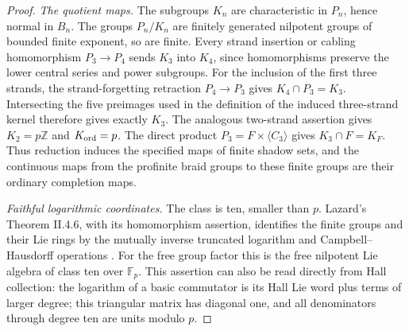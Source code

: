 \begin{proof}
\emph{The quotient maps.}
The subgroups $K_n$ are characteristic in $P_n$, hence normal in
$B_n$. The groups $P_n/K_n$ are finitely generated nilpotent groups
of bounded finite exponent, so are finite. Every strand insertion
or cabling homomorphism $P_3\to P_4$ sends $K_3$ into $K_4$,
since homomorphisms preserve the lower central series and power
subgroups. For the inclusion of the first three strands, the
strand-forgetting retraction $P_4\to P_3$ gives
$K_4\cap P_3=K_3$. Intersecting the five preimages used in
the definition of the induced three-strand kernel therefore gives
exactly $K_3$. The analogous two-strand assertion gives
$K_2=p\mathbb Z$ and $K_{\rm ord}=p$.
The direct product $P_3=F\times\langle C_3\rangle$ gives
$K_3\cap F=K_F$.
Thus reduction induces the specified maps of finite shadow sets,
and the continuous maps from the profinite braid groups to these
finite groups are their ordinary completion maps.

\emph{Faithful logarithmic coordinates.}
The class is ten, smaller than $p$. Lazard's Theorem II.4.6,
with its homomorphism assertion, identifies the finite groups
and their Lie rings by the mutually inverse truncated logarithm
and Campbell--Hausdorff operations \cite{DE_Lazard1954}.
For the free group factor this is the free nilpotent Lie algebra
of class ten over $\mathbb F_p$. This assertion can also be read
directly from Hall collection: the logarithm of a basic
commutator is its Hall Lie word plus terms of larger degree;
this triangular matrix has diagonal one, and all denominators
through degree ten are units modulo $p$.


\end{proof}
